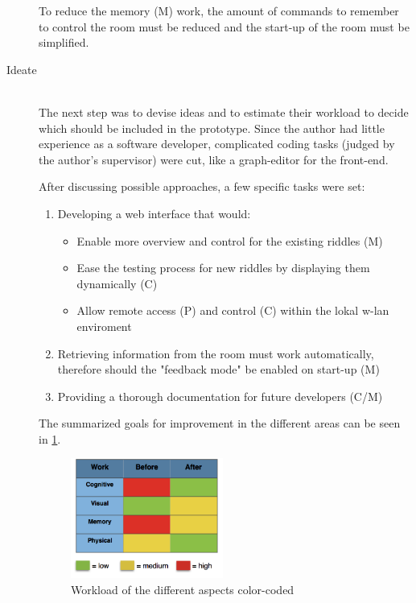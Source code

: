 \begin{description}
	To reduce the memory (M) work, the amount of commands to remember to control the room must be reduced and the start-up of the room must be simplified.

	\item [Ideate]\hfill \\
	The next step was to devise ideas and to estimate their workload to decide 
	which should be included in the prototype. Since the author had little experience as a software developer,
	complicated coding tasks (judged by the author's supervisor) were cut, 
	like a graph-editor for the front-end.

	After discussing possible approaches, a few specific tasks were set:
	      \begin{enumerate}
		      \item Developing a web interface that would:
		            \begin{itemize}
			            \item Enable more overview and control for the existing riddles (M)
			            \item Ease the testing process for new riddles by displaying them dynamically (C)
			            \item Allow remote access (P) and control (C) within the lokal w-lan enviroment
		            \end{itemize}
		      \item Retrieving information from the room must work automatically, therefore should the "feedback mode" be enabled on start-up (M)
		      \item Providing a thorough documentation for future developers  (C/M)
	      \end{enumerate}

	      The summarized goals for improvement in the different areas can be seen in \ref{fig:workload}.

	      \begin{figure}[th]
		      \centering
		      \includegraphics[width=50mm,scale=.5]{Figures/workload}
		      \decoRule
		      \caption[workload]{Workload of the different aspects color-coded}
		      \label{fig:workload}
	      \end{figure}


\end{description}
